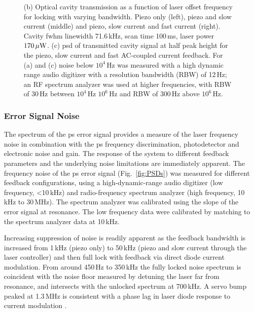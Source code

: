 \begin{figure}[htbp]
{(b) Optical cavity transmission as a function of laser offset frequency for locking with varying bandwidth. Piezo only (left), piezo and slow current (middle) and piezo, slow current and fast current (right). Cavity \gls*{fwhm} linewidth 71.6\,kHz, scan time 100\,ms, laser power $170\rm\,\mu W$. (c) \Gls*{psd} of transmitted cavity signal at half peak height for the piezo, slow current and fast AC-coupled current feedback. For (a) and (c) noise below $10^4$\,Hz was measured with a high dynamic range audio digitizer with a resolution bandwidth (RBW) of 12\,Hz; an RF spectrum analyzer was used at higher frequencies, with RBW of 30\,Hz between $10^4$\,Hz \textendash$10^6$\,Hz and RBW of 300\,Hz above $10^6$\,Hz.} 
\end{figure}

\subsubsection{Error Signal Noise}
The spectrum of the \gls*{ps} error signal provides a measure of the laser frequency noise in combination with the \gls*{ps} frequency discrimination, photodetector and electronic noise and gain.  The response of the system to different feedback parameters and the underlying noise limitations are immediately apparent.
The frequency noise  of the \gls*{ps} error signal (Fig.~\ref{fig:PSDs}) was measured for different feedback configurations, using a high-dynamic-range audio digitizer (low frequency, \textless10\,kHz) and radio-frequency spectrum analyzer (high frequency, 10\,kHz to 30\,MHz). The spectrum analyzer was calibrated using the slope of the error signal at resonance. The low frequency data were calibrated by matching to the spectrum analyzer data at 10\,kHz.  

Increasing suppression of noise is readily apparent as the feedback bandwidth is increased from 1\,kHz (piezo only) to 50\,kHz (piezo and slow current through the laser controller) and then full lock with feedback via direct diode current modulation. From around 450\,Hz to 350\,kHz the fully locked noise spectrum is coincident with the noise floor measured by detuning the laser far from resonance, and intersects with the unlocked spectrum at 700\,kHz.  A servo bump peaked at 1.3\,MHz is consistent with a phase lag in laser diode response to current modulation \cite{wiemanhollberg}.


